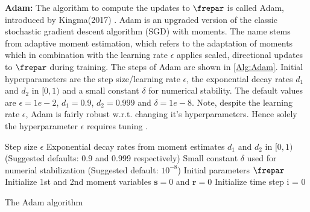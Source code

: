 \textbf{Adam:}
The algorithm to compute the updates to \(\frepar\) is called Adam, introduced by Kingma(2017) \cite{kingma2017adam}. Adam is an upgraded version of the classic stochastic gradient descent algorithm (SGD) with moments. The name stems from adaptive moment estimation, which refers to the adaptation of moments which in combination with the learning rate \(\epsilon\) applies scaled, directional updates to \(\frepar\) during training. The steps of Adam are shown in \cref{Alg:Adam}. Initial hyperparameters are the step size/learning rate \(\epsilon\), the exponential decay rates \(d_1\) and \(d_2\) in \([0,1)\) and a small constant \(\delta\) for numerical stability. The default values are \(\epsilon=1e-2\), \(d_1=0.9\), \(d_2=0.999\) and \(\delta=1e-8\).  Note, despite the learning rate \(\epsilon\), Adam is fairly robust w.r.t. changing it's hyperparameters. Hence solely the hyperparameter \(\epsilon\) requires tuning \cite{Goodfellow}.
\begin{algorithm}[hbp!]
	\begin{algorithmic}
		\SetAlgoLined
		\REQUIRE Step size $\epsilon$
		\REQUIRE Exponential decay rates from moment estimates $d_1$ and $d_2$ in \([0,1)\)\\
		(Suggested defaults: 0.9 and 0.999 respectively)
		\REQUIRE Small constant $\delta$ used for numerial stabilization (Suggested default: $10^{-8}$)
		\REQUIRE Initial parameters $\frepar$\\
		Initialize 1st and 2nd moment variables \(\mathbf{s}=0\) and \(\mathbf{r}=0\)\;
		Initialize time step i = 0\;
	\end{algorithmic}
	\caption{The Adam algorithm}
	\label{Alg:Adam}
\end{algorithm} 

